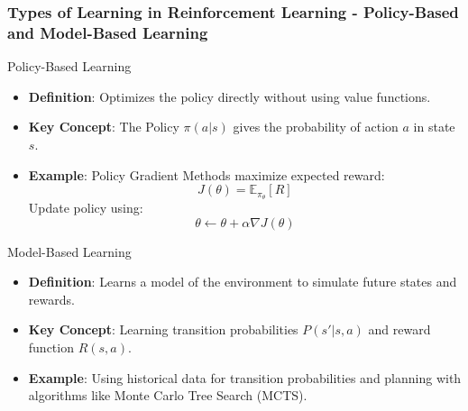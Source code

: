 \documentclass[aspectratio=169]{beamer}
\begin{document}
\begin{frame}[fragile]
    \frametitle{Types of Learning in Reinforcement Learning - Policy-Based and Model-Based Learning}
    \begin{block}{Policy-Based Learning}
        \begin{itemize}
            \item \textbf{Definition}: Optimizes the policy directly without using value functions.
            \item \textbf{Key Concept}: The Policy \( \pi(a | s) \) gives the probability of action \( a \) in state \( s \).
            \item \textbf{Example}: Policy Gradient Methods maximize expected reward:
                \begin{equation}
                J(\theta) = \mathbb{E}_{\pi_\theta}[R]
                \end{equation}
                Update policy using:
                \begin{equation}
                \theta \leftarrow \theta + \alpha \nabla J(\theta)
                \end{equation}
        \end{itemize}
    \end{block}

    \begin{block}{Model-Based Learning}
        \begin{itemize}
            \item \textbf{Definition}: Learns a model of the environment to simulate future states and rewards.
            \item \textbf{Key Concept}: Learning transition probabilities \( P(s' | s, a) \) and reward function \( R(s, a) \).
            \item \textbf{Example}: Using historical data for transition probabilities and planning with algorithms like Monte Carlo Tree Search (MCTS).
        \end{itemize}
    \end{block}
\end{frame}
\end{document}
